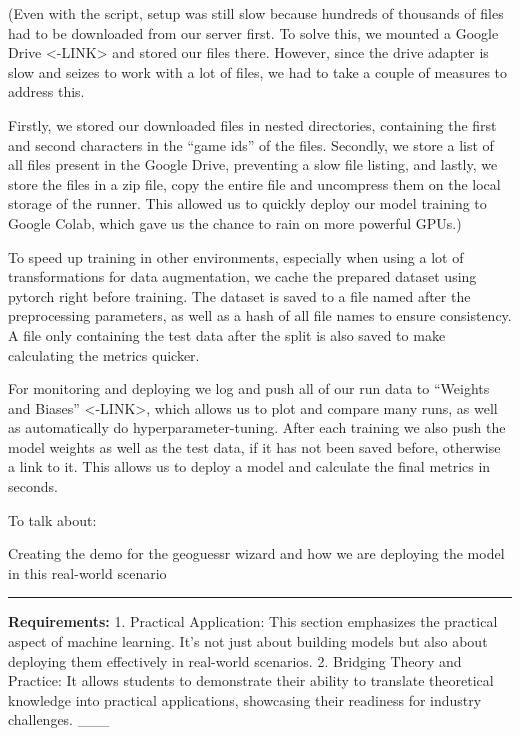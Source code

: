 \documentclass{article}
\begin{document}
(Even with the script, setup was still slow because hundreds of
thousands of files had to be downloaded from our server first. To solve
this, we mounted a Google Drive \textless-LINK\textgreater{} and stored
our files there. However, since the drive adapter is slow and seizes to
work with a lot of files, we had to take a couple of measures to address
this.

Firstly, we stored our downloaded files in nested directories,
containing the first and second characters in the ``game ids'' of the
files. Secondly, we store a list of all files present in the Google
Drive, preventing a slow file listing, and lastly, we store the files in
a zip file, copy the entire file and uncompress them on the local
storage of the runner. This allowed us to quickly deploy our model
training to Google Colab, which gave us the chance to rain on more
powerful GPUs.)

To speed up training in other environments, especially when using a lot
of transformations for data augmentation, we cache the prepared dataset
using pytorch right before training. The dataset is saved to a file
named after the preprocessing parameters, as well as a hash of all file
names to ensure consistency. A file only containing the test data after
the split is also saved to make calculating the metrics quicker.

For monitoring and deploying we log and push all of our run data to
``Weights and Biases'' \textless-LINK\textgreater, which allows us to
plot and compare many runs, as well as automatically do
hyperparameter-tuning. After each training we also push the model
weights as well as the test data, if it has not been saved before,
otherwise a link to it. This allows us to deploy a model and calculate
the final metrics in seconds.

To talk about:

Creating the demo for the geoguessr wizard and how we are deploying the
model in this real-world scenario

\begin{center}\rule{0.5\linewidth}{0.5pt}\end{center}

\textbf{Requirements:} 1. Practical Application: This section emphasizes
the practical aspect of machine learning. It's not just about building
models but also about deploying them effectively in real-world
scenarios. 2. Bridging Theory and Practice: It allows students to
demonstrate their ability to translate theoretical knowledge into
practical applications, showcasing their readiness for industry
challenges. \_\_\_
\end{document}
